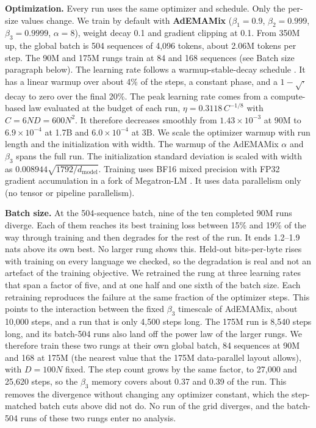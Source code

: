 \textbf{Optimization.} Every run uses the same optimizer and schedule. Only the per-size values change. We train by default with \textbf{AdEMAMix} \citep{pagliardini_ademamix_2024} ($\beta_1 = 0.9$, $\beta_2 = 0.999$, $\beta_3 = 0.9999$, $\alpha = 8$), weight decay 0.1 and gradient clipping at 0.1. From 350M up, the global batch is 504 sequences of 4,096 tokens, about 2.06M tokens per step. The 90M and 175M rungs train at 84 and 168 sequences (see Batch size paragraph below). The learning rate follows a warmup-stable-decay schedule \citep{hagele_scaling_2024}. It has a linear warmup over about 4\% of the steps, a constant phase, and a $1-\sqrt{\cdot}$ decay to zero over the final 20\%. The peak learning rate comes from a compute-based law evaluated at the budget of each run, $\eta = 0.3118\, C^{-1/8}$ with $C = 6 N D = 600 N^2$. It therefore decreases smoothly from $1.43 \times 10^{-3}$ at 90M to $6.9 \times 10^{-4}$ at 1.7B and $6.0 \times 10^{-4}$ at 3B. We scale the optimizer warmup with run length and the initialization with width. The warmup of the AdEMAMix $\alpha$ and $\beta_3$ spans the full run. The initialization standard deviation is scaled with width as $0.008944 \sqrt{1792 / d_{\mathrm{model}}}$. Training uses BF16 mixed precision with FP32 gradient accumulation in a fork of Megatron-LM \citep{shoeybi_megatron-lm_2019}. It uses data parallelism only (no tensor or pipeline parallelism).

\textbf{Batch size.} At the 504-sequence batch, nine of the ten completed 90M runs diverge. Each of them reaches its best training loss between 15\% and 19\% of the way through training and then degrades for the rest of the run. It ends 1.2--1.9 nats above its own best. No larger rung shows this. Held-out bits-per-byte rises with training on every language we checked, so the degradation is real and not an artefact of the training objective. We retrained the rung at three learning rates that span a factor of five, and at one half and one sixth of the batch size. Each retraining reproduces the failure at the same fraction of the optimizer steps. This points to the interaction between the fixed $\beta_3$ timescale of AdEMAMix, about 10,000 steps, and a run that is only 4,500 steps long. The 175M run is 8,540 steps long, and its batch-504 runs also land off the power law of the larger rungs. We therefore train these two rungs at their own global batch, 84 sequences at 90M and 168 at 175M (the nearest value that the 175M data-parallel layout allows), with $D = 100N$ fixed. The step count grows by the same factor, to 27,000 and 25,620 steps, so the $\beta_3$ memory covers about 0.37 and 0.39 of the run. This removes the divergence without changing any optimizer constant, which the step-matched batch cuts above did not do. No run of the grid diverges, and the batch-504 runs of these two rungs enter no analysis.

